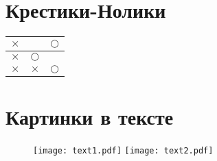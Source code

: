 \documentclass[a4paper, 12pt]{article}
\begin{document}
\graphicspath{{images/}{images2/}} %
\date{27.02.21}
\author{А.Н.Золкин}
\bmstutitlelab

\newpage
\section{Крестики-Нолики}
\begin{center}
  \begin{tabular}{|l|r|c|}
    \hline
    $\times$ &            & $\bigcirc$ \\
    \hline
    $\times$ & $\bigcirc$ &            \\
    \hline
    $\times$ & $\times$   & $\bigcirc$ \\
    \hline
  \end{tabular}
\end{center}

\section{Картинки в тексте}
\begin{figure}[h]
  \texttt{[image: text1.pdf]}
  \texttt{[image: text2.pdf]}
\end{figure}

\newpage
\end{document}
